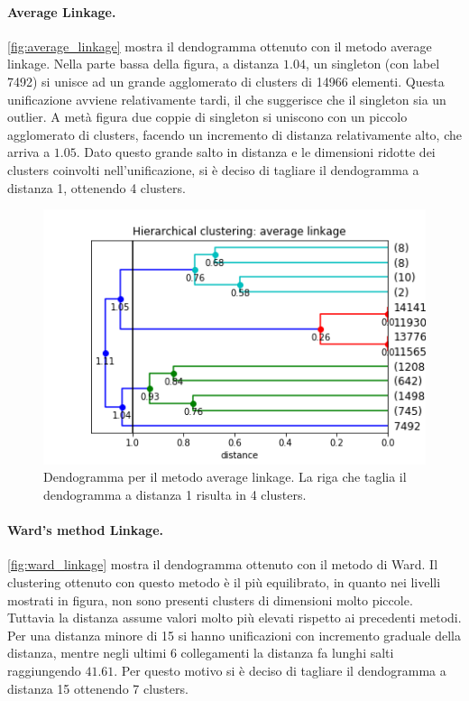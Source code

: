 \documentclass[10pt,a4paper,twocolumn]{article}
\begin{document}
\paragraph{Average Linkage.}
\autoref{fig:average_linkage} mostra il dendogramma ottenuto con il metodo average linkage. Nella parte bassa della figura, a distanza $1.04$, un singleton (con label 7492) si unisce ad un grande agglomerato di clusters di 14966 elementi. Questa unificazione avviene relativamente tardi, il che suggerisce che il singleton sia un outlier. A metà figura due coppie di singleton si uniscono con un piccolo agglomerato di clusters, facendo un incremento di distanza relativamente alto, che arriva a $1.05$. Dato questo grande salto in distanza e le dimensioni ridotte dei clusters coinvolti nell'unificazione, si è deciso di tagliare il dendogramma a distanza 1, ottenendo 4 clusters.

\begin{figure}[hbtp]
\centering
\includegraphics[width=\columnwidth]{../images/hierarchical_clustering_average-annotated.png}
\caption{Dendogramma per il metodo average linkage. La riga che taglia il dendogramma a distanza 1 risulta in 4 clusters.}
\label{fig:average_linkage}
\end{figure}

\paragraph{Ward's method Linkage.}
\autoref{fig:ward_linkage} mostra il dendogramma ottenuto con il metodo di Ward. Il clustering ottenuto con questo metodo è il più equilibrato, in quanto nei livelli mostrati in figura, non sono presenti clusters di dimensioni molto piccole. Tuttavia la distanza assume valori molto più elevati rispetto ai precedenti metodi. Per una distanza minore di 15 si hanno unificazioni con incremento graduale della distanza, mentre negli ultimi 6 collegamenti la distanza fa lunghi salti raggiungendo $41.61$. Per questo motivo si è deciso di tagliare il dendogramma a distanza 15 ottenendo 7 clusters.
\end{document}

